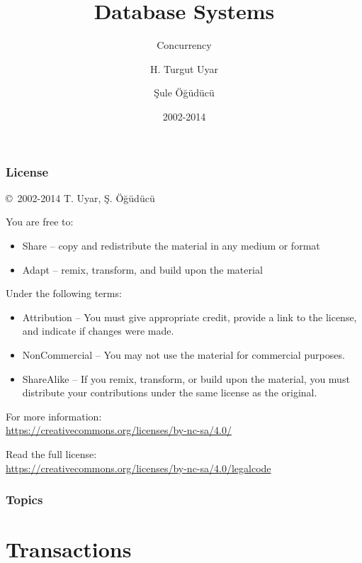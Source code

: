 \documentclass[dvipsnames]{beamer}
\title{Database Systems}
\subtitle{Concurrency}
\author{H. Turgut Uyar \and Şule Öğüdücü}
\date{2002-2014}
\theoremstyle{plain}
\begin{document}
\begin{frame}
  \titlepage
\end{frame}

\begin{frame}
  \frametitle{License}

  \hfill
  \copyright~2002-2014 T. Uyar, Ş. Öğüdücü

  \vfill
  \begin{footnotesize}
    You are free to:
    \begin{itemize}
      \itemsep0em
      \item Share -- copy and redistribute the material in any medium or format
      \item Adapt -- remix, transform, and build upon the material
    \end{itemize}

    Under the following terms:
    \begin{itemize}
      \itemsep0em
      \item Attribution -- You must give appropriate credit, provide a link to
        the license, and indicate if changes were made.

      \item NonCommercial -- You may not use the material for commercial
        purposes.

      \item ShareAlike -- If you remix, transform, or build upon the material,
        you must distribute your contributions under the same license as the
        original.
    \end{itemize}
  \end{footnotesize}

  \begin{small}
    For more information:\\
    \url{https://creativecommons.org/licenses/by-nc-sa/4.0/}

    \smallskip
    Read the full license:\\
    \url{https://creativecommons.org/licenses/by-nc-sa/4.0/legalcode}
  \end{small}
\end{frame}

\begin{frame}
  \frametitle{Topics}
  \tableofcontents
\end{frame}

\section{Transactions}
\end{document}
